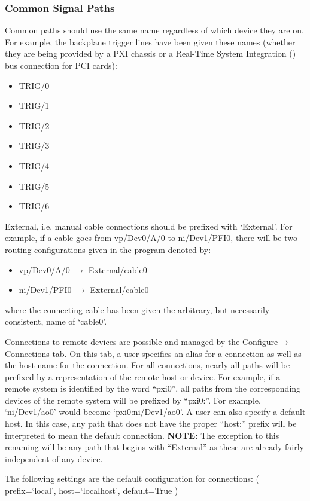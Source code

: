 \subsubsection{Common Signal Paths}
Common paths should use the same name regardless of which device they are on.
For example, the backplane trigger lines have been given these names (whether
they are being provided by a PXI chassis or a Real-Time System Integration
() bus connection for PCI cards):
\begin{itemize}
  \item TRIG/0
  \item TRIG/1
  \item TRIG/2
  \item TRIG/3
  \item TRIG/4
  \item TRIG/5
  \item TRIG/6
\end{itemize}

External, i.e. manual cable connections should be prefixed with `External'.  For
example, if a cable goes from vp/Dev0/A/0 to ni/Dev1/PFI0, there will be two
routing configurations given in the program denoted by:
\begin{itemize}
  \item vp/Dev0/A/0  $\rightarrow$  External/cable0
  \item ni/Dev1/PFI0 $\rightarrow$  External/cable0
\end{itemize}
where the connecting cable has been given the arbitrary, but necessarily
consistent, name of `cable0'.


Connections to remote devices are possible and managed by the
Configure$\rightarrow$Connections tab.  On this tab, a user specifies an alias for a
connection as well as the host name for the connection.
For all connections, nearly all paths will be prefixed by a
representation of the remote host or device.  For example, if a remote system is
identified by the word ``pxi0'', all paths from the corresponding devices of the
remote system will be prefixed by ``pxi0:''.  For example, `ni/Dev1/ao0' would become
`pxi0:ni/Dev1/ao0'.  A user can also specify a default host.  In this case, any
path that does not have the proper ``host:'' prefix will be interpreted to mean
the default connection.
\textbf{NOTE:} The exception to this renaming will be any path that begins with ``External'' as
these are already fairly independent of any device.

The following settings are the default configuration
for connections:
( prefix=`local', host=`localhost', default=True )


